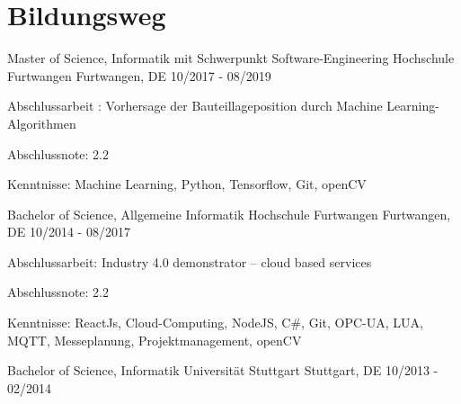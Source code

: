 
\section{Bildungsweg}
\cventry
{Master of Science, Informatik mit Schwerpunkt Software-Engineering} %
{Hochschule Furtwangen} %
{Furtwangen, DE} %
{10/2017 - 08/2019} %
\begin{cvitems}
\item {Abschlussarbeit : Vorhersage der Bauteillageposition durch Machine Learning-Algorithmen}
\item {Abschlussnote: 2.2}
\item {Kenntnisse: Machine Learning, Python, Tensorflow, Git, openCV}
\end{cvitems}

\cventry
{Bachelor of Science, Allgemeine Informatik} %
{Hochschule Furtwangen} %
{Furtwangen, DE} %
{10/2014 - 08/2017} %
\begin{cvitems}
\item {Abschlussarbeit: Industry 4.0 demonstrator – cloud based services}
\item {Abschlussnote: 2.2}
\item {Kenntnisse: ReactJs, Cloud-Computing, NodeJS, C\#, Git, OPC-UA, LUA, MQTT, Messeplanung, Projektmanagement, openCV}
\end{cvitems}

\cventry
{Bachelor of Science, Informatik} %
{Universität Stuttgart} %
{Stuttgart, DE} %
{10/2013 - 02/2014} %